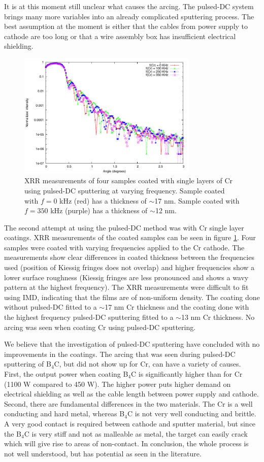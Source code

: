 It is at this moment still unclear what causes the arcing. The pulsed-DC system brings many more variables into an already complicated sputtering process. The best assumption at the moment is either that the cables from power supply to cathode are too long or that a wire assembly box has insufficient electrical shielding.

\begin{figure}[!h]
	\center
	\includegraphics[height=6cm]{figures/athena/coatings/cr_pulsed.pdf}
\caption{\footnotesize XRR measurements of four samples coated with single layers of Cr using pulsed-DC sputtering at varying frequency. Sample coated with $f=0$ kHz (red) has a thickness of $\sim$17 nm. Sample coated with $f=350$ kHz (purple) has a thickness of $\sim$12 nm.}\label{fig:cr-pulsed}
\end{figure}

The second attempt at using the pulsed-DC method was with Cr single layer coatings. XRR measurements of the coated samples can be seen in figure \ref{fig:cr-pulsed}. Four samples were coated with varying frequencies applied to the Cr cathode. The measurements show clear differences in coated thickness between the frequencies used (position of Kiessig fringes does not overlap) and higher frequencies show a lower surface roughness (Kiessig fringes are less pronounced and shows a wavy pattern at the highest frequency). The XRR measurements were difficult to fit using IMD, indicating that the films are of non-uniform density. The coating done without pulsed-DC fitted to a $\sim$17 nm Cr thickness and the coating done with the highest frequency pulsed-DC sputtering fitted to a $\sim$13 nm Cr thickness. No arcing was seen when coating Cr using pulsed-DC sputtering.

We believe that the investigation of pulsed-DC sputtering have concluded with no improvements in the coatings. The arcing that was seen during pulsed-DC sputtering of B$_4$C, but did not show up for Cr, can have a variety of causes. First, the output power when coating B$_4$C is significantly higher than for Cr (1100 W compared to 450 W). The higher power puts higher demand on electrical shielding as well as the cable length between power supply and cathode. Second, there are fundamental differences in the two materials. The Cr is a well conducting and hard metal, whereas B$_4$C is not very well conducting and brittle. A very good contact is required between cathode and sputter material, but since the B$_4$C is very stiff and not as malleable as metal, the target can easily crack which will give rise to areas of non-contact. In conclusion, the whole process is not well understood, but has potential as seen in the literature.

